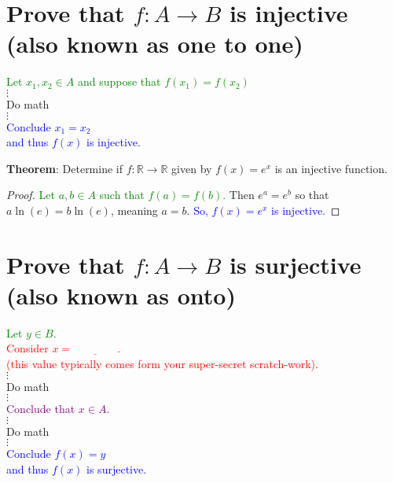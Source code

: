 \documentclass[11pt, oneside]{article}
\begin{document}
\section{ Prove that $f: A \rightarrow B$ is injective (also known as one to one)}

		  \begin{center}
		  \textcolor{green}{Let $x_1, x_2 \in A$ and suppose that $f(x_1)=f(x_2)$}\\ 
		     $\vdots$ \\ Do math   \\ $\vdots$ \\  
  		  \textcolor{blue}{Conclude $x_1=x_2$  \\ and  thus $f(x)$ is injective.}\\[0.2in]
   		  \end{center} 

\noindent \textbf{Theorem}:   Determine if $f: \mathbb{R} \rightarrow \mathbb{R}$ given by $f(x) = e^{x}$ is an injective function.
 \begin{proof}
 \textcolor{green}{Let $a,b \in A$ such that $f(a)=f(b)$.} Then $e^{a}=e^{b}$ so that $a\ln{(e)}=b\ln{(e)}$, meaning $a=b$. \textcolor{blue}{So, $f(x)=e^{x}$ is injective.}
 \end{proof}
 
 
		 \newpage
 
 \section{Prove that $f: A \rightarrow B$ is surjective (also known as onto) }
 
 	            \begin{center}
		\textcolor{green}{Let $y \in B$.}\\   
		\textcolor{red}{Consider $x= \underline{\qquad \qquad}$. \\
		(this value typically comes form your super-secret scratch-work). }\\
 		    $\vdots$ \\ Do math   \\ $\vdots$ \\  
		\textcolor{purple}{Conclude that $x \in A$.}\\
  		   $\vdots$ \\ Do math   \\ $\vdots$ \\  
   		  \textcolor{blue}{Conclude $f(x) = y$\\
    		 and thus $f(x)$ is surjective.}
    		 \end{center} 
     
\end{document}
